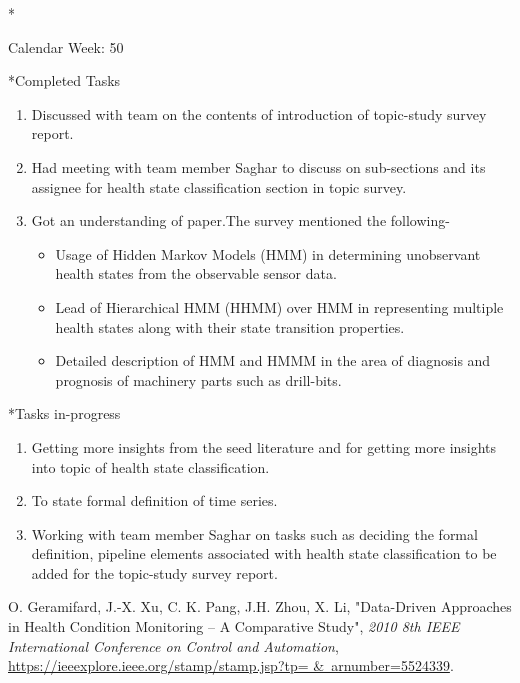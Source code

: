 \documentclass[11pt,a4paper]{article}
\begin{document}
\begin{section}*{Calendar Week: 50 \hfill \date{11 December, 2020}}

\begin{subsection}*{Completed Tasks}
    \begin{enumerate}
        \item 
            Discussed with team on the contents of introduction of topic-study survey report.
        \item
            Had meeting with team member Saghar to discuss on sub-sections and its assignee for health state classification section in topic survey.
        \item
            Got an understanding of paper\cite{survey62}.The survey mentioned the following-
            \begin{itemize}
                \item Usage of Hidden Markov Models (HMM) in determining unobservant health states from the observable sensor data. 
                \item Lead of Hierarchical HMM (HHMM) over HMM in representing multiple health states along with their state transition properties.
                \item Detailed description of HMM and HMMM in the area of diagnosis and prognosis of machinery parts such as drill-bits.
            \end{itemize}
             
    \end{enumerate}
\end{subsection}
\begin{subsection}*{Tasks in-progress}
    \begin{enumerate}
        \item
            Getting more insights from the seed literature\cite{survey62} and \cite{survey63} for getting more insights into topic of health state classification.
        \item
            To state formal definition of time series.
        \item
            Working with team member Saghar on tasks such as deciding the formal definition, pipeline elements associated with health state classification to be added for the topic-study survey report.
    \end{enumerate}
\end{subsection}
\begin{thebibliography}{9}
    {O. Geramifard, J.-X. Xu, C. K. Pang, J.H. Zhou, X. Li},
    "Data-Driven Approaches in Health Condition Monitoring – A
    Comparative Study",
    \textit{2010 8th IEEE International Conference on
    Control and Automation},
    \href{https://ieeexplore.ieee.org/stamp/stamp.jsp?tp= \&\ arnumber=5524339}{https://ieeexplore.ieee.org/stamp/stamp.jsp?tp= \&\ arnumber=5524339}. 
    

\end{thebibliography}
\end{section}
\end{document}
